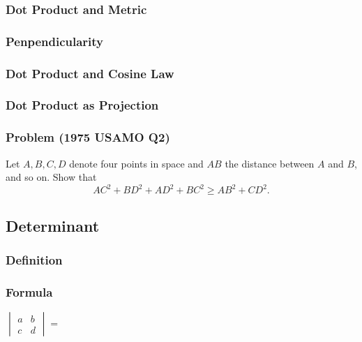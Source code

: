 \documentclass{article}
\begin{document}
\subsubsection{Dot Product and Metric}
\vspace{40px}

\subsubsection{Penpendicularity}
\pagebreak

\subsubsection{Dot Product and Cosine Law}
\vspace{100px}

\subsubsection{Dot Product as Projection}
\vspace{100px}

\subsubsection{Problem (1975 USAMO Q2)}
Let $A,B,C,D$ denote four points in space and $AB$ the distance between $A$ and $B$, and so on. Show that\[AC^2+BD^2+AD^2+BC^2\ge AB^2+CD^2.\]

\pagebreak

\subsection{Determinant}
\subsubsection{Definition}
\vspace*{20px}
\subsubsection{Formula}

$
\begin{vmatrix}
    a & b\\
    c & d
\end{vmatrix}
=
$
\end{document}
